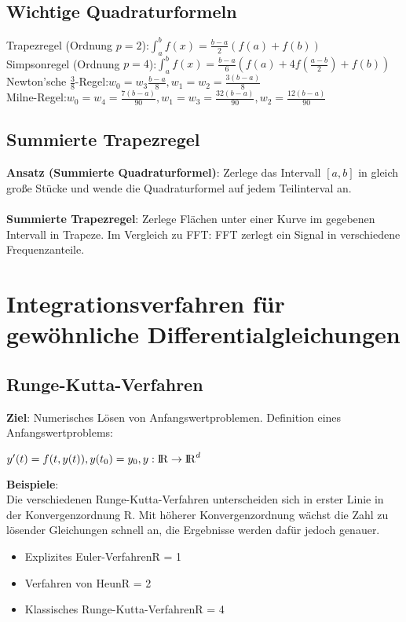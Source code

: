 \documentclass[10pt,a4paper]{article}
\def\realnumbers{{\rm I\!R}}
\begin{document}
  \newpage
  \subsection{Wichtige Quadraturformeln}
        Trapezregel (Ordnung $p = 2$):\hfill$\int_{a}^{b} f(x) = \frac{b - a}{2} (f(a) + f(b))$ \\
        Simpsonregel (Ordnung $p = 4$):\hfill$\int_{a}^{b} f(x) = \frac{b - a}{6} (f(a) + 4f(\frac{a-b}{2}) + f(b))$ \\
        Newton'sche $\frac{3}{8}$-Regel:\hfill$w_0 = w_3 \frac{b - a}{8}, w_1 = w_2 = \frac{3(b - a)}{8}$ \\
        Milne-Regel:\hfill$w_0 = w_4 = \frac{7(b - a)}{90}, w_1 = w_3 = \frac{32(b - a)}{90}, w_2 = \frac{12(b - a)}{90}$ \\

	\subsection{Summierte Trapezregel}
	\textbf{Ansatz (Summierte Quadraturformel)}: Zerlege das Intervall $[a, b]$ in gleich große Stücke und wende die Quadraturformel auf jedem Teilinterval an.\\\\
	\textbf{Summierte Trapezregel}: Zerlege Flächen unter einer Kurve im gegebenen Intervall in Trapeze. Im Vergleich zu FFT: FFT zerlegt ein Signal in verschiedene Frequenzanteile.
	\section{Integrationsverfahren für gewöhnliche Differentialgleichungen}
	\subsection{Runge-Kutta-Verfahren}
	\textbf{Ziel}: Numerisches Lösen von Anfangswertproblemen. Definition eines Anfangswertproblems:
	\begin{center} 
		$y'(t) = f(t, y(t)), y(t_0) = y_0, y: \realnumbers \rightarrow \realnumbers^d$
	\end{center}
	\textbf{Beispiele}:\\
	Die verschiedenen Runge-Kutta-Verfahren unterscheiden sich in erster Linie in der Konvergenzordnung R. Mit höherer Konvergenzordnung wächst die Zahl zu lösender Gleichungen schnell an, die Ergebnisse werden dafür jedoch genauer.
	\begin{itemize}
		\item Explizites Euler-Verfahren\hfill R = 1
		\item Verfahren von Heun\hfill R = 2
		\item Klassisches Runge-Kutta-Verfahren\hfill R = 4
	\end{itemize}
\end{document}

